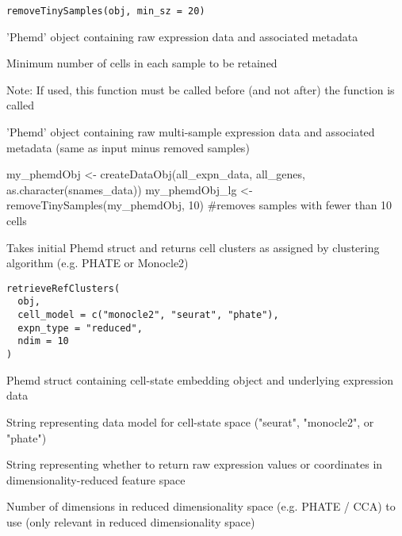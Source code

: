 \documentclass[a4paper]{book}
\begin{document}
%
\begin{Usage}
\begin{verbatim}
removeTinySamples(obj, min_sz = 20)
\end{verbatim}
\end{Usage}
%
\begin{Arguments}
\begin{ldescription}
\item[\code{obj}] 'Phemd' object containing raw expression data and associated metadata

\item[\code{min\_sz}] Minimum number of cells in each sample to be retained
\end{ldescription}
\end{Arguments}
%
\begin{Details}\relax
Note: If used, this function must be called before (and not after) the  function is called
\end{Details}
%
\begin{Value}
'Phemd' object containing raw multi-sample expression data and associated metadata (same as input minus removed samples)
\end{Value}
%
\begin{Examples}
\begin{ExampleCode}
my_phemdObj <- createDataObj(all_expn_data, all_genes, as.character(snames_data))
my_phemdObj_lg <- removeTinySamples(my_phemdObj, 10) #removes samples with fewer than 10 cells

\end{ExampleCode}
\end{Examples}
%
\begin{Description}\relax
Takes initial Phemd struct and returns cell clusters as assigned by clustering algorithm (e.g. PHATE or Monocle2)
\end{Description}
%
\begin{Usage}
\begin{verbatim}
retrieveRefClusters(
  obj,
  cell_model = c("monocle2", "seurat", "phate"),
  expn_type = "reduced",
  ndim = 10
)
\end{verbatim}
\end{Usage}
%
\begin{Arguments}
\begin{ldescription}
\item[\code{obj}] Phemd struct containing cell-state embedding object and underlying expression data

\item[\code{cell\_model}] String representing data model for cell-state space ("seurat", "monocle2", or "phate")

\item[\code{expn\_type}] String representing whether to return raw expression values or coordinates in dimensionality-reduced feature space

\item[\code{ndim}] Number of dimensions in reduced dimensionality space (e.g. PHATE / CCA) to use (only relevant in reduced dimensionality space)
\end{ldescription}
\end{Arguments}
\end{document}
